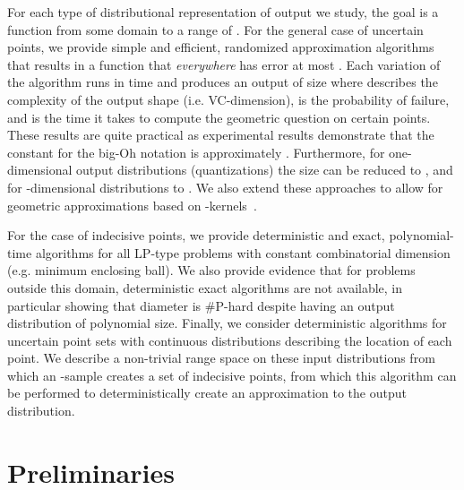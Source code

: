 \documentclass{journal}
\begin{document}
For each type of distributional representation of output we study, the goal is a function from some domain to a range of .  
For the general case of uncertain points, we provide simple and efficient, randomized approximation algorithms that results in a function that \emph{everywhere} has error at most .  Each variation of the algorithm runs in  time and produces an output of size  where  describes the complexity of the output shape (i.e. VC-dimension),  is the probability of failure, and  is the time it takes to compute the geometric question on certain points.  These results are quite practical as experimental results demonstrate that the constant for the big-Oh notation is approximately .  Furthermore, for one-dimensional output distributions (quantizations) the size can be reduced to , and for -dimensional distributions to .  
We also extend these approaches to allow for geometric approximations based on -kernels~\cite{AHV04,AHV07}.  

For the case of indecisive points, we provide deterministic and exact, polynomial-time algorithms for all LP-type problems with constant combinatorial dimension (e.g. minimum enclosing ball).  We also provide evidence that for problems outside this domain, deterministic exact algorithms are not available, in particular showing that diameter is \#P-hard despite having an output distribution of polynomial size.  
Finally, we consider deterministic algorithms for uncertain point sets with continuous distributions describing the location of each point.  We describe a non-trivial range space on these input distributions from which an -sample creates a set of indecisive points, from which this algorithm can be performed to deterministically create an approximation to the output distribution.  
































\section {Preliminaries}\label{sec:prelim}
\end{document}
